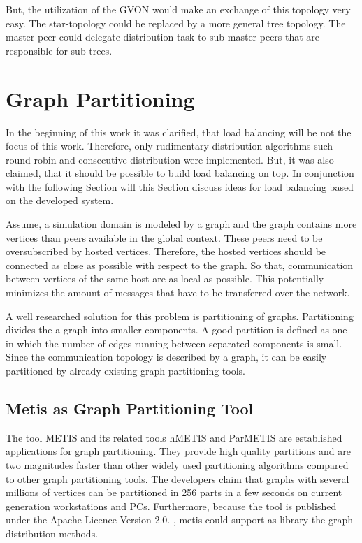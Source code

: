 But, the utilization of the GVON would make an exchange of this
topology very easy. The star-topology could be replaced by a more
general tree topology. The master peer could delegate distribution
task to sub-master peers that are responsible for sub-trees.


\section*{Graph Partitioning}

In the beginning of this work it was clarified, that load balancing
will be not the focus of this work. Therefore, only rudimentary
distribution algorithms such round robin and consecutive
distribution were implemented. But, it was also claimed, that it
should be possible to build load balancing on top. In conjunction
with the following Section will this Section discuss ideas for load
balancing based on the developed system.

Assume, a simulation domain is modeled by a graph and the graph
contains more vertices than peers available in the global
context. These peers need to be oversubscribed by hosted vertices.
Therefore, the hosted vertices should be connected as
close as possible with respect to the graph. So that, communication
between vertices of the same host are as local as possible. This
potentially minimizes the amount of messages that have to be
transferred over the network.

A well researched solution for this problem is partitioning of
graphs. Partitioning divides the a graph into smaller components.  A
good partition is defined as one in which the number of edges
running between separated components is small. Since the
communication topology is described by a graph, it can be easily
partitioned by already existing graph partitioning tools.

\subsection*{Metis as Graph Partitioning Tool}
The tool METIS and its related tools hMETIS and ParMETIS are
established applications for graph partitioning. They provide high
quality partitions and are two magnitudes faster than other widely
used partitioning algorithms compared to other graph partitioning
tools. The developers claim that graphs with several millions of
vertices can be partitioned in 256 parts in a few seconds on current
generation workstations and PCs.  Furthermore, because the tool is
published under the Apache Licence Version 2.0. , metis could
support as library the graph distribution methods.

